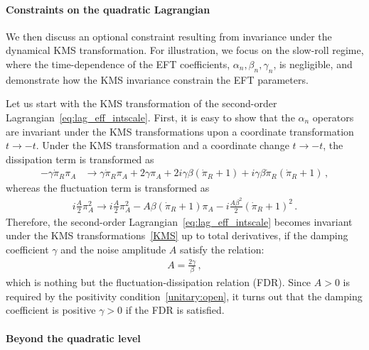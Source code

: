\documentclass[a4paper,11pt]{article}
\begin{document}
\paragraph{Constraints on the quadratic Lagrangian}

We then discuss an optional constraint resulting from invariance under the dynamical KMS transformation. For illustration, we focus on the slow-roll regime, where the time-dependence of the EFT coefficients, $\alpha_n, \beta_n, \gamma_n$, is negligible, and demonstrate how the KMS invariance constrain the EFT parameters.

\medskip
Let us start with the KMS transformation of 
the second-order Lagrangian~\eqref{eq:lag_eff_intscale}. 
First, it is easy to show that the $\alpha_n$ operators are invariant under the KMS transformations upon a coordinate transformation $t\to-t$. 
Under the KMS transformation and a coordinate change $t\to-t$, the dissipation term is transformed as 
\begin{align}
 -\gamma\dot{\pi}_R\pi_A 
 &\to \gamma\dot{\pi}_R\pi_A 
 +2\gamma\pi_A+2i\gamma\beta(\dot{\pi}_R+1)
 + i\gamma\beta\dot{\pi}_R(\dot{\pi}_R+1)\,,
\end{align}
whereas the fluctuation term is transformed as
\begin{align}
 i\frac{A}{2}\pi_A^2 
 \to i\frac{A}{2}\pi_A^2 
-A\beta(\dot{\pi}_R+1)\pi_A
 - i\frac{A\beta^2}{2}(\dot{\pi}_R+1)^2\,.
\end{align}
Therefore, the second-order Lagrangian~\eqref{eq:lag_eff_intscale} becomes 
invariant under the KMS transformations~\eqref{KMS} up to total derivatives,
if the damping coefficient $\gamma$ and the noise amplitude $A$ satisfy the relation:
\begin{align}
A=\frac{2\gamma}{\beta}\,,
\end{align}
which is nothing but the fluctuation-dissipation relation (FDR). 
Since $A>0$ is required by the positivity condition~\eqref{unitary:open}, it turns out that the damping coefficient is positive $\gamma>0$ if the FDR is satisfied. 


\paragraph{Beyond the quadratic level}
\end{document}
